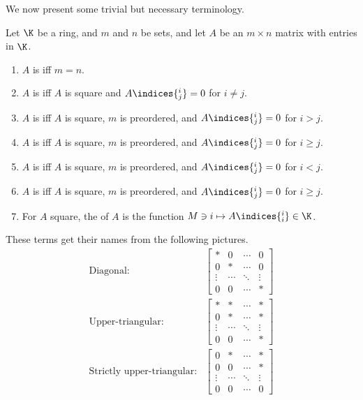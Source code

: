 We now present some trivial but necessary terminology.
\begin{dfn}{}{}
	Let $\K$ be a ring, and $m$ and $n$ be sets, and let $A$ be an $m\times n$ matrix with entries in $\K$.
	\begin{enumerate}
		\item $A$ is  iff $m=n$.
		\item $A$ is  iff $A$ is square and $A\indices{^i_j}=0$ for $i\neq j$.
		\item $A$ is  iff $A$ is square, $m$ is preordered, and $A\indices{^i_j}=0$ for $i>j$.
		\item $A$ is  iff $A$ is square, $m$ is preordered, and $A\indices{^i_j}=0$ for $i\geq j$.
		\item $A$ is  iff $A$ is square, $m$ is preordered, and $A\indices{^i_j}=0$ for $i<j$.
		\item $A$ is  iff $A$ is square, $m$ is preordered, and $A\indices{^i_j}=0$ for $i\geq j$.
		\item For $A$ square, the  of $A$ is the function $M\ni i\mapsto A\indices{^i_i}\in \K$.
	\end{enumerate}
	\begin{rmk}
		These terms get their names from the following pictures.
		\begin{subequations}
			\begin{align*}
			\text{Diagonal:} & \begin{bmatrix}* & 0 & \cdots & 0 \\ 0 & * & \cdots & 0 \\ \vdots & \cdots & \ddots & \vdots \\ 0 & 0 & \cdots & *\end{bmatrix} \\
			\text{Upper-triangular:} & \begin{bmatrix}* & * & \cdots & * \\ 0 & * & \cdots & * \\ \vdots & \cdots & \ddots & \vdots \\ 0 & 0 & \cdots & *\end{bmatrix} \\
			\text{Strictly upper-triangular:} & \begin{bmatrix}0 & * & \cdots & * \\ 0 & 0 & \cdots & * \\ \vdots & \cdots & \ddots & \vdots \\ 0 & 0 & \cdots & 0\end{bmatrix} \\

\end{align*}
\end{subequations}
\end{rmk}
\end{dfn}

